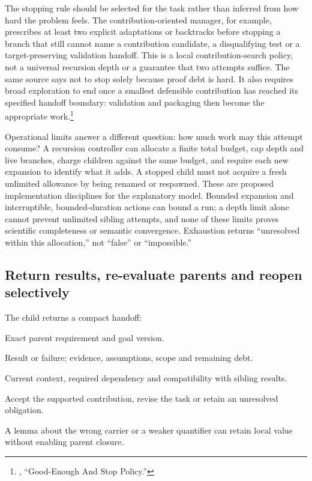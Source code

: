 The stopping rule should be selected for the task rather than inferred from
how hard the problem feels. The contribution-oriented manager, for example,
prescribes at least two explicit adaptations or backtracks before stopping a
branch that still cannot name a contribution candidate, a disqualifying test or
a target-preserving validation handoff. This is a local contribution-search
policy, not a universal recursion depth or a guarantee that two attempts suffice.
The same source says not to stop solely because proof debt is hard. It also
requires broad exploration to end once a smallest defensible contribution has
reached its specified handoff boundary: validation and packaging then become
the appropriate work.\footnote{,
``Good-Enough And Stop Policy.''}

Operational limits answer a different question: how much work may this attempt
consume? A recursion controller can allocate a finite total budget, cap depth
and live branches, charge children against the same budget, and require each
new expansion to identify what it adds. A stopped child must not acquire a
fresh unlimited allowance by being renamed or respawned. These are proposed
implementation disciplines for the explanatory model. Bounded expansion and
interruptible, bounded-duration actions can bound a run; a depth limit alone
cannot prevent unlimited sibling attempts, and none of these limits proves
scientific completeness or semantic convergence. Exhaustion returns ``unresolved
within this allocation,'' not ``false'' or ``impossible.''

\subsection{Return results, re-evaluate parents and reopen selectively}
The child returns a compact handoff:
\begin{description}[style=nextline,leftmargin=1.7cm,labelwidth=1.5cm,itemsep=1pt,parsep=0pt,topsep=4pt]
\item[Input] Exact parent requirement and goal version.
\item[Output] Result or failure; evidence, assumptions, scope and remaining debt.
\item[Check] Current context, required dependency and compatibility with sibling results.
\item[Next] Accept the supported contribution, revise the task or retain an unresolved obligation.
\end{description}
A lemma about the wrong carrier or a weaker quantifier can retain local value
without enabling parent closure.

